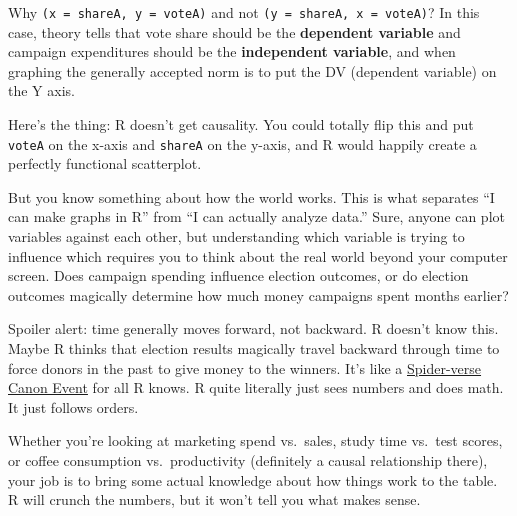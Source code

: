 \documentclass[
  letterpaper,
]{book}
\begin{document}
Why \texttt{(x\ =\ shareA,\ y\ =\ voteA)} and not
\texttt{(y\ =\ shareA,\ x\ =\ voteA)}? In this case, theory tells that
vote share should be the \textbf{dependent variable} and campaign
expenditures should be the \textbf{independent variable}, and when
graphing the generally accepted norm is to put the DV (dependent
variable) on the Y axis.

\begin{tcolorbox}[enhanced jigsaw, colframe=quarto-callout-tip-color-frame, breakable, arc=.35mm, bottomtitle=1mm, bottomrule=.15mm, colbacktitle=quarto-callout-tip-color!10!white, rightrule=.15mm, colback=white, opacityback=0, opacitybacktitle=0.6, coltitle=black, left=2mm, toptitle=1mm, toprule=.15mm, titlerule=0mm, leftrule=.75mm, title=\textcolor{quarto-callout-tip-color}{\faLightbulb}\hspace{0.5em}{Data Storytelling: R Doesn't Know Causality}]

Here's the thing: R doesn't get causality. You could totally flip this
and put \texttt{voteA} on the x-axis and \texttt{shareA} on the y-axis,
and R would happily create a perfectly functional scatterplot.

But you know something about how the world works. This is what separates
``I can make graphs in R'' from ``I can actually analyze data.'' Sure,
anyone can plot variables against each other, but understanding which
variable is trying to influence which requires you to think about the
real world beyond your computer screen. Does campaign spending influence
election outcomes, or do election outcomes magically determine how much
money campaigns spent months earlier?

Spoiler alert: time generally moves forward, not backward. R doesn't
know this. Maybe R thinks that election results magically travel
backward through time to force donors in the past to give money to the
winners. It's like a
\href{https://intothespiderverse.fandom.com/wiki/Canon_Events}{Spider-verse
Canon Event} for all R knows. R quite literally just sees numbers and
does math. It just follows orders.

Whether you're looking at marketing spend vs.~sales, study time vs.~test
scores, or coffee consumption vs.~productivity (definitely a causal
relationship there), your job is to bring some actual knowledge about
how things work to the table. R will crunch the numbers, but it won't
tell you what makes sense.

\end{tcolorbox}
\end{document}
